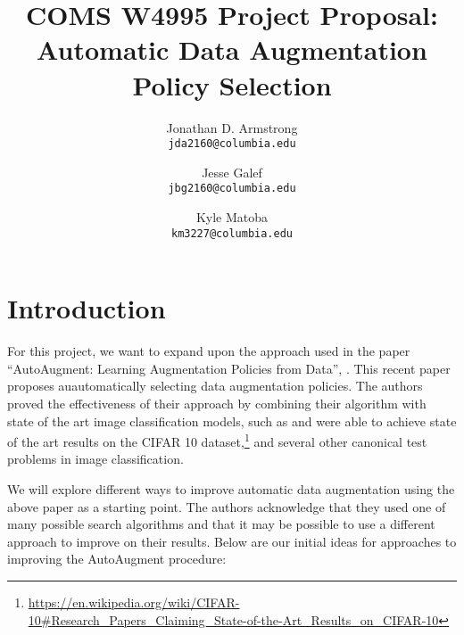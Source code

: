 \documentclass[10pt,twocolumn,letterpaper]{article}
\begin{document}
\title{COMS W4995 Project Proposal: Automatic Data Augmentation Policy Selection}

\author{Jonathan D. Armstrong\\
{\tt\small jda2160@columbia.edu}
\and
Jesse Galef\\
{\tt\small jbg2160@columbia.edu}
\and
Kyle Matoba\\
{\tt\small km3227@columbia.edu}
}

\maketitle


\section{Introduction}

For this project, we want to expand upon the approach used in the paper ``AutoAugment: Learning Augmentation Policies from Data'', \cite{Cubuk2018}. This recent paper proposes auautomatically selecting data augmentation policies. The authors proved the effectiveness of their approach by combining their algorithm with state of the art image classification models, such as \cite{Yamada2018} and were able to achieve state of the art results on the CIFAR 10 dataset,\footnote{\url{https://en.wikipedia.org/wiki/CIFAR-10\#Research\_Papers\_Claiming\_State-of-the-Art\_Results\_on\_CIFAR-10}} and several other canonical test problems in image classification.

We will explore different ways to improve automatic data augmentation using the above paper as a starting point. The authors acknowledge that they used one of many possible search algorithms and that it may be possible to use a different approach to improve on their results. Below are our initial ideas for approaches to improving the AutoAugment procedure:
\end{document}
